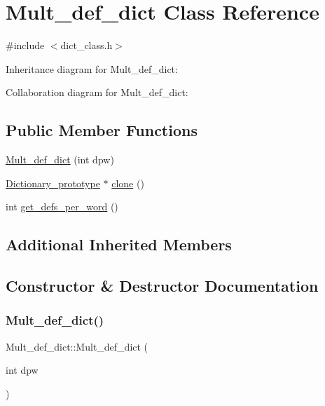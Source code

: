 \hypertarget{class_mult__def__dict}{}\section{Mult\+\_\+def\+\_\+dict Class Reference}
\label{class_mult__def__dict}


{\ttfamily \#include $<$dict\+\_\+class.\+h$>$}



Inheritance diagram for Mult\+\_\+def\+\_\+dict\+:


Collaboration diagram for Mult\+\_\+def\+\_\+dict\+:
\subsection*{Public Member Functions}
\begin{DoxyCompactItemize}
\item 
\mbox{\hyperlink{class_mult__def__dict_a3869612ff681b7c0a50a55d017ceb0c6}{Mult\+\_\+def\+\_\+dict}} (int dpw)
\item 
\mbox{\hyperlink{class_dictionary__prototype}{Dictionary\+\_\+prototype}} $\ast$ \mbox{\hyperlink{class_mult__def__dict_ab9f196ca32bb48e465ded573e8484db6}{clone}} ()
\item 
int \mbox{\hyperlink{class_mult__def__dict_a623909670ca67cedb3f112dfade592c6}{get\+\_\+defs\+\_\+per\+\_\+word}} ()
\end{DoxyCompactItemize}
\subsection*{Additional Inherited Members}


\subsection{Constructor \& Destructor Documentation}
\mbox{\label{class_mult__def__dict_a3869612ff681b7c0a50a55d017ceb0c6}} 
\subsubsection{\texorpdfstring{Mult\_def\_dict()}{Mult\_def\_dict()}}
{\footnotesize\ttfamily Mult\+\_\+def\+\_\+dict\+::\+Mult\+\_\+def\+\_\+dict (\begin{DoxyParamCaption}\item[{int}]{dpw }\end{DoxyParamCaption})\hspace{0.3cm}{\ttfamily [inline]}}



